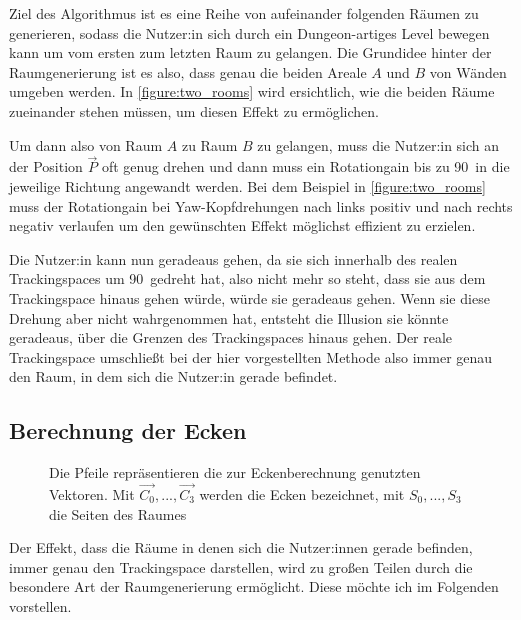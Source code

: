 Ziel des Algorithmus ist es eine Reihe von aufeinander folgenden Räumen zu generieren, sodass die Nutzer:in sich durch ein Dungeon-artiges Level bewegen kann um vom ersten zum letzten Raum zu gelangen.
Die Grundidee hinter der Raumgenerierung ist es also, dass genau die beiden Areale $A$ und $B$ von Wänden umgeben werden. %
In \autoref{figure:two_rooms} wird ersichtlich, wie die beiden Räume zueinander stehen müssen, um diesen Effekt zu ermöglichen.

Um dann also von Raum $A$ zu Raum $B$ zu gelangen, muss die Nutzer:in sich an der Position $\vec{P}$ oft genug drehen und dann muss ein Rotationgain bis zu 90\textdegree\ in die jeweilige Richtung angewandt werden. Bei dem Beispiel in \autoref{figure:two_rooms} muss der Rotationgain bei Yaw-Kopfdrehungen nach links positiv und nach rechts negativ verlaufen um den gewünschten Effekt möglichst effizient zu erzielen.

Die Nutzer:in kann nun geradeaus gehen, da sie sich innerhalb des realen Trackingspaces um 90\textdegree\ gedreht hat, also nicht mehr so steht, dass sie aus dem Trackingspace hinaus gehen würde, würde sie geradeaus gehen. Wenn sie diese Drehung aber nicht wahrgenommen hat, entsteht die Illusion sie könnte geradeaus, über die Grenzen des Trackingspaces hinaus gehen.
Der reale Trackingspace umschließt bei der hier vorgestellten Methode also immer genau den Raum, in dem sich die Nutzer:in gerade befindet.

\subsection{Berechnung der Ecken}
\label{subsection:calccorners}

\begin{figure}[H]
    \centering
    \caption{Die Pfeile repräsentieren die zur Eckenberechnung genutzten Vektoren. Mit $\vec{C_0}, ..., \vec{C_3}$ werden die Ecken bezeichnet, mit $S_{0}, ...,  S_3$ die Seiten des Raumes}
    \label{figure:calculateCornersFig}
\end{figure}

Der Effekt, dass die Räume in denen sich die Nutzer:innen gerade befinden, immer genau den Trackingspace darstellen, wird zu großen Teilen durch die besondere Art der Raumgenerierung ermöglicht. Diese möchte ich im Folgenden vorstellen.

